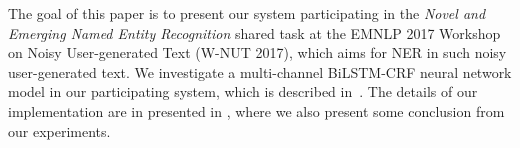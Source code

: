 %

The goal of this paper is to present our system participating in the \textit{Novel and Emerging Named Entity Recognition} shared task at the EMNLP 2017 Workshop on Noisy User-generated Text (W-NUT 2017), which aims for NER in such noisy user-generated text.
We investigate a multi-channel BiLSTM-CRF neural network model in our participating system,  which is described in~.
The details of our implementation are in presented in , where we also present some conclusion from our experiments.

